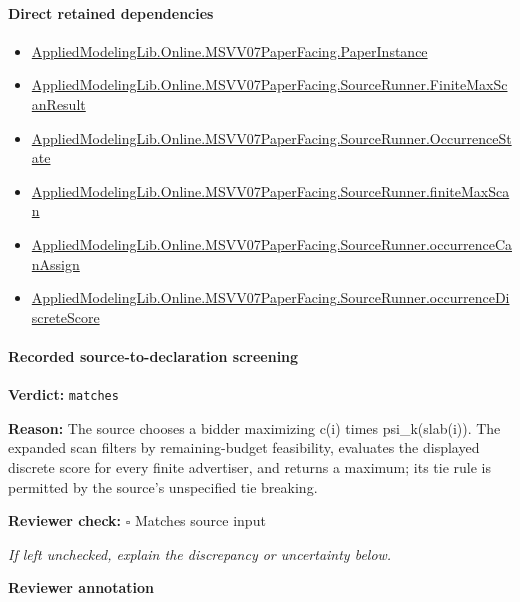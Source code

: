 \documentclass[10pt]{article}
\newcommand{\reviewerbox}{%
  \par\noindent\fbox{\parbox{0.96\linewidth}{\rule{0pt}{0.38in}}}\par
}
\newcommand{\reviewmatch}[1]{%
  \par\noindent\textbf{Reviewer check:} $\square$\; #1\par
  \noindent\emph{If left unchecked, explain the discrepancy or uncertainty below.}\par
}
\begin{document}
\paragraph{Direct retained dependencies}
\begin{itemize}\raggedright
\item \hyperlink{governing-declaration-11907576ec71eeb5}{Applied\allowbreak{}Modeling\allowbreak{}Lib.\allowbreak{}Online.\allowbreak{}MSVV07\allowbreak{}Paper\allowbreak{}Facing.\allowbreak{}Paper\allowbreak{}Instance}
\item \hyperlink{governing-declaration-ebb7db2383e5a26e}{Applied\allowbreak{}Modeling\allowbreak{}Lib.\allowbreak{}Online.\allowbreak{}MSVV07\allowbreak{}Paper\allowbreak{}Facing.\allowbreak{}Source\allowbreak{}Runner.\allowbreak{}Finite\allowbreak{}Max\allowbreak{}Scan\allowbreak{}Result}
\item \hyperlink{governing-declaration-2eff7815f49c1d41}{Applied\allowbreak{}Modeling\allowbreak{}Lib.\allowbreak{}Online.\allowbreak{}MSVV07\allowbreak{}Paper\allowbreak{}Facing.\allowbreak{}Source\allowbreak{}Runner.\allowbreak{}Occurrence\allowbreak{}State}
\item \hyperlink{governing-declaration-22b1949f835402cc}{Applied\allowbreak{}Modeling\allowbreak{}Lib.\allowbreak{}Online.\allowbreak{}MSVV07\allowbreak{}Paper\allowbreak{}Facing.\allowbreak{}Source\allowbreak{}Runner.\allowbreak{}finite\allowbreak{}Max\allowbreak{}Scan}
\item \hyperlink{governing-declaration-54a700f2397309bc}{Applied\allowbreak{}Modeling\allowbreak{}Lib.\allowbreak{}Online.\allowbreak{}MSVV07\allowbreak{}Paper\allowbreak{}Facing.\allowbreak{}Source\allowbreak{}Runner.\allowbreak{}occurrence\allowbreak{}Can\allowbreak{}Assign}
\item \hyperlink{governing-declaration-2d753caf9af38bde}{Applied\allowbreak{}Modeling\allowbreak{}Lib.\allowbreak{}Online.\allowbreak{}MSVV07\allowbreak{}Paper\allowbreak{}Facing.\allowbreak{}Source\allowbreak{}Runner.\allowbreak{}occurrence\allowbreak{}Discrete\allowbreak{}Score}
\end{itemize}
\paragraph{Recorded source-to-declaration screening}
\textbf{Verdict:} \texttt{matches}
\\
{\raggedright
\textbf{Reason:} The source chooses a bidder maximizing c(i) times psi\_\allowbreak{}k(slab(i)).\allowbreak{} The expanded scan filters by remaining-\allowbreak{}budget feasibility, evaluates the displayed discrete score for every finite advertiser, and returns a maximum;\allowbreak{} its tie rule is permitted by the source's unspecified tie breaking.\allowbreak{}
\par}
\reviewmatch{Matches source input}
\noindent\textbf{Reviewer annotation}\par
\reviewerbox
\clearpage
\hypertarget{paper-prerequisite-8c5fc45bd0b54d7b}{}
\end{document}

